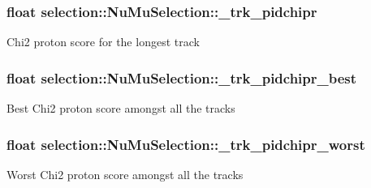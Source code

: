 \subsubsection[{\texorpdfstring{\+\_\+trk\+\_\+pidchipr}{_trk_pidchipr}}]{\setlength{\rightskip}{0pt plus 5cm}float selection\+::\+Nu\+Mu\+Selection\+::\+\_\+trk\+\_\+pidchipr\hspace{0.3cm}{\ttfamily [private]}}\hypertarget{classselection_1_1NuMuSelection_af65eea94c4d2811de82693751684131d}{}\label{classselection_1_1NuMuSelection_af65eea94c4d2811de82693751684131d}
Chi2 proton score for the longest track 
\subsubsection[{\texorpdfstring{\+\_\+trk\+\_\+pidchipr\+\_\+best}{_trk_pidchipr_best}}]{\setlength{\rightskip}{0pt plus 5cm}float selection\+::\+Nu\+Mu\+Selection\+::\+\_\+trk\+\_\+pidchipr\+\_\+best\hspace{0.3cm}{\ttfamily [private]}}\hypertarget{classselection_1_1NuMuSelection_ad0b2f58434040e2c9e9304a93252d5e1}{}\label{classselection_1_1NuMuSelection_ad0b2f58434040e2c9e9304a93252d5e1}
Best Chi2 proton score amongst all the tracks 
\subsubsection[{\texorpdfstring{\+\_\+trk\+\_\+pidchipr\+\_\+worst}{_trk_pidchipr_worst}}]{\setlength{\rightskip}{0pt plus 5cm}float selection\+::\+Nu\+Mu\+Selection\+::\+\_\+trk\+\_\+pidchipr\+\_\+worst\hspace{0.3cm}{\ttfamily [private]}}\hypertarget{classselection_1_1NuMuSelection_a0373f32c36b713af9febf4e5e3b6899a}{}\label{classselection_1_1NuMuSelection_a0373f32c36b713af9febf4e5e3b6899a}
Worst Chi2 proton score amongst all the tracks 
